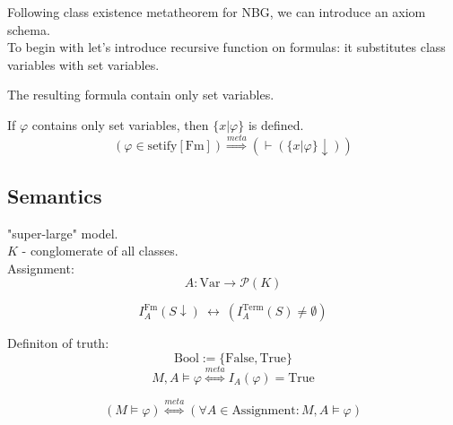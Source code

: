 \documentclass[10pt,a4paper]{article}
\theoremstyle{definition}
\renewcommand{\iff}{\ \longleftrightarrow\ }
\newcommand{\power}{\mathcal{P}}
\begin{document}
Following class existence metatheorem for NBG, we can introduce an axiom schema.\\
To begin with let's introduce recursive function on formulas: it substitutes class variables with set variables.


The resulting formula contain only set variables.



If $\varphi$ contains only set variables, then 
$\{x | \varphi\}$ is defined.
\[(\varphi\in\mathrm{setify}[\mathrm{Fm}])\stackrel{meta}{\Longrightarrow} ( \vdash (\{x | \varphi\}\downarrow)) \]

\subsection{Semantics}
"super-large" model.\\
$K$ - conglomerate of all classes.\\

Assignment:\\
\[A:\mbox{Var}\to \power(K)\]

\[I^{\mathrm{Fm}}_A(S\downarrow) \iff (I^{\mathrm{Term}}_A(S)\neq\emptyset)\]

Definiton of truth:
\[\mbox{Bool} := \{\mbox{False}, \mbox{True}\}\]
\[M,A\vDash \varphi \stackrel{meta}{\Longleftrightarrow} I_A(\varphi)=\mbox{True}\]

\[(M\vDash \varphi) \stackrel{meta}{\Longleftrightarrow} (\forall A\in \mbox{Assignment}: M,A\vDash \varphi)\]

\fi
\end{document}

